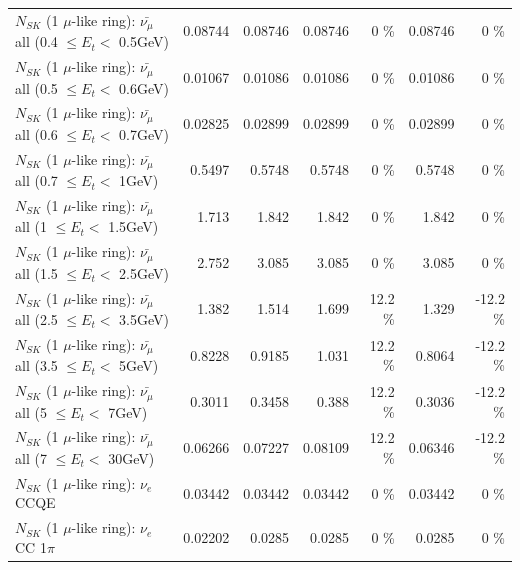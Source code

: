 \begin{table}
\begin{tabular}{| l | r | r | r  r | r  r |}
 $N_{SK}$ (1 $\mu$-like ring): $\bar{\nu_{\mu}}$ all (0.4 $\leq E_{t} <$ 0.5GeV) &         0.08744 &         0.08746 &         0.08746 &        0 \%  &         0.08746 &        0 \%  \\ 
 $N_{SK}$ (1 $\mu$-like ring): $\bar{\nu_{\mu}}$ all (0.5 $\leq E_{t} <$ 0.6GeV) &         0.01067 &         0.01086 &         0.01086 &        0 \%  &         0.01086 &        0 \%  \\ 
 $N_{SK}$ (1 $\mu$-like ring): $\bar{\nu_{\mu}}$ all (0.6 $\leq E_{t} <$ 0.7GeV) &         0.02825 &         0.02899 &         0.02899 &        0 \%  &         0.02899 &        0 \%  \\ 
   $N_{SK}$ (1 $\mu$-like ring): $\bar{\nu_{\mu}}$ all (0.7 $\leq E_{t} <$ 1GeV) &          0.5497 &          0.5748 &          0.5748 &        0 \%  &          0.5748 &        0 \%  \\ 
   $N_{SK}$ (1 $\mu$-like ring): $\bar{\nu_{\mu}}$ all (1 $\leq E_{t} <$ 1.5GeV) &           1.713 &           1.842 &           1.842 &        0 \%  &           1.842 &        0 \%  \\ 
 $N_{SK}$ (1 $\mu$-like ring): $\bar{\nu_{\mu}}$ all (1.5 $\leq E_{t} <$ 2.5GeV) &           2.752 &           3.085 &           3.085 &        0 \%  &           3.085 &        0 \%  \\ 
 $N_{SK}$ (1 $\mu$-like ring): $\bar{\nu_{\mu}}$ all (2.5 $\leq E_{t} <$ 3.5GeV) &           1.382 &           1.514 &           1.699 &     12.2 \%  &           1.329 &    -12.2 \%  \\ 
   $N_{SK}$ (1 $\mu$-like ring): $\bar{\nu_{\mu}}$ all (3.5 $\leq E_{t} <$ 5GeV) &          0.8228 &          0.9185 &           1.031 &     12.2 \%  &          0.8064 &    -12.2 \%  \\ 
     $N_{SK}$ (1 $\mu$-like ring): $\bar{\nu_{\mu}}$ all (5 $\leq E_{t} <$ 7GeV) &          0.3011 &          0.3458 &           0.388 &     12.2 \%  &          0.3036 &    -12.2 \%  \\ 
    $N_{SK}$ (1 $\mu$-like ring): $\bar{\nu_{\mu}}$ all (7 $\leq E_{t} <$ 30GeV) &         0.06266 &         0.07227 &         0.08109 &     12.2 \%  &         0.06346 &    -12.2 \%  \\ 
\hline
\hline
\hline
                                      $N_{SK}$ (1 $\mu$-like ring): $\nu_e$ CCQE &         0.03442 &         0.03442 &         0.03442 &        0 \%  &         0.03442 &        0 \%  \\ 
                                 $N_{SK}$ (1 $\mu$-like ring): $\nu_e$ CC 1$\pi$ &         0.02202 &          0.0285 &          0.0285 &        0 \%  &          0.0285 &        0 \%  \\ 

\end{tabular}
\end{table}
